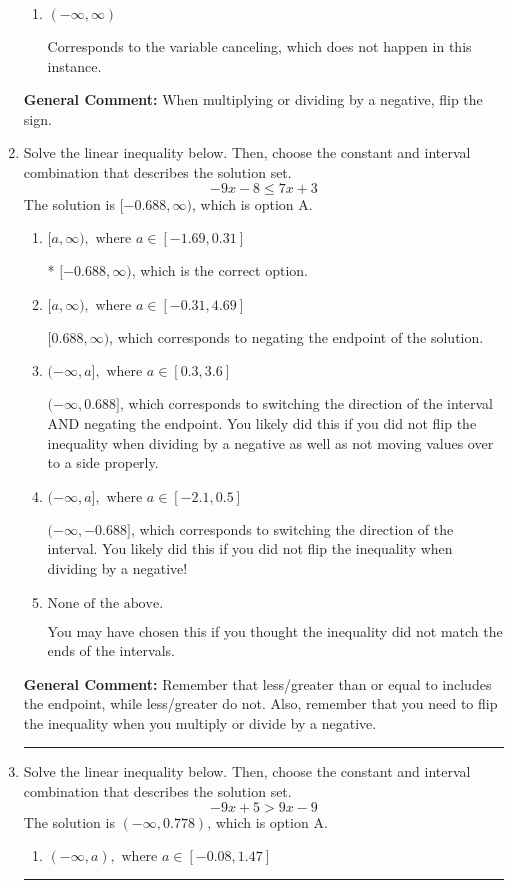 \documentclass{extbook}[14pt]
\newcommand{\litem}[1]{\item #1

\rule{\textwidth}{0.4pt}}
\begin{document}
\begin{enumerate}
{\begin{enumerate}[label=\Alph*.]
Corresponds to inverting the inequality and negating the solution.
\item \( (-\infty, \infty) \)

Corresponds to the variable canceling, which does not happen in this instance.
\end{enumerate}

\textbf{General Comment:} When multiplying or dividing by a negative, flip the sign.
}
\litem{
Solve the linear inequality below. Then, choose the constant and interval combination that describes the solution set.
\[ -9x -8 \leq 7x + 3 \]The solution is \( [-0.688, \infty) \), which is option A.\begin{enumerate}[label=\Alph*.]
\item \( [a, \infty), \text{ where } a \in [-1.69, 0.31] \)

* $[-0.688, \infty)$, which is the correct option.
\item \( [a, \infty), \text{ where } a \in [-0.31, 4.69] \)

 $[0.688, \infty)$, which corresponds to negating the endpoint of the solution.
\item \( (-\infty, a], \text{ where } a \in [0.3, 3.6] \)

 $(-\infty, 0.688]$, which corresponds to switching the direction of the interval AND negating the endpoint. You likely did this if you did not flip the inequality when dividing by a negative as well as not moving values over to a side properly.
\item \( (-\infty, a], \text{ where } a \in [-2.1, 0.5] \)

 $(-\infty, -0.688]$, which corresponds to switching the direction of the interval. You likely did this if you did not flip the inequality when dividing by a negative!
\item \( \text{None of the above}. \)

You may have chosen this if you thought the inequality did not match the ends of the intervals.
\end{enumerate}

\textbf{General Comment:} Remember that less/greater than or equal to includes the endpoint, while less/greater do not. Also, remember that you need to flip the inequality when you multiply or divide by a negative.
}
\litem{
Solve the linear inequality below. Then, choose the constant and interval combination that describes the solution set.
\[ -9x + 5 > 9x -9 \]The solution is \( (-\infty, 0.778) \), which is option A.\begin{enumerate}[label=\Alph*.]
\item \( (-\infty, a), \text{ where } a \in [-0.08, 1.47] \)


\end{enumerate}}
\end{enumerate}
\end{document}
